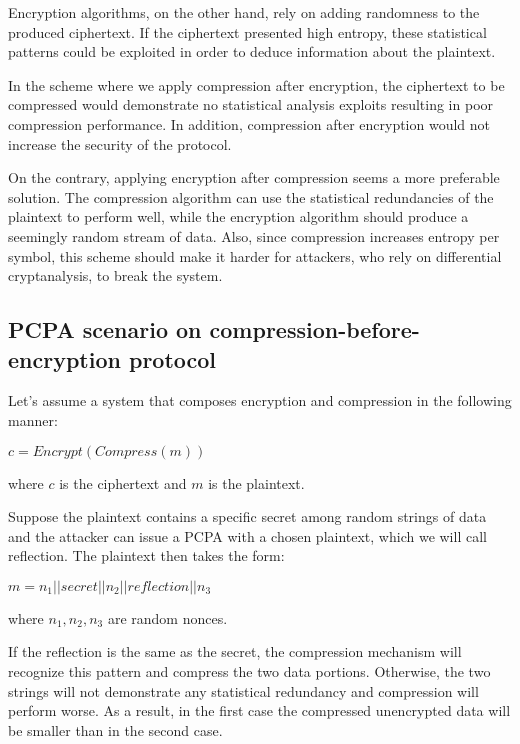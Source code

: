 Encryption algorithms, on the other hand, rely on adding randomness to the
produced ciphertext. If the ciphertext presented high entropy, these statistical
patterns could be exploited in order to deduce information about the plaintext.

In the scheme where we apply compression after encryption, the ciphertext to be
compressed would demonstrate no statistical analysis exploits resulting in
poor compression performance. In addition, compression after encryption would
not increase the security of the protocol.

On the contrary, applying encryption after compression seems a more
preferable solution. The compression algorithm can use the statistical
redundancies of the plaintext to perform well, while the encryption algorithm
should produce a seemingly random stream of data. Also, since compression
increases entropy per symbol, this scheme should make it harder for attackers,
who rely on differential cryptanalysis, to break the system.

\subsection{PCPA scenario on compression-before-encryption protocol}

Let's assume a system that composes encryption and compression in the following
manner:

\begin{math}c = Encrypt(Compress(m))\end{math}

where \begin{math}c\end{math} is the ciphertext and \begin{math}m\end{math} is
the plaintext.

Suppose the plaintext contains a specific secret among random strings of data
and the attacker can issue a PCPA with a chosen plaintext, which we will call
reflection. The plaintext then takes the form:

\begin{math}m = n_1 || secret || n_2 || reflection || n_3\end{math}

where \begin{math}n_1, n_2, n_3\end{math} are random nonces.

If the reflection is the same as the secret, the compression mechanism will
recognize this pattern and compress the two data portions. Otherwise, the
two strings will not demonstrate any statistical redundancy and compression will
perform worse. As a result, in the first case the compressed unencrypted data
will be smaller than in the second case.

